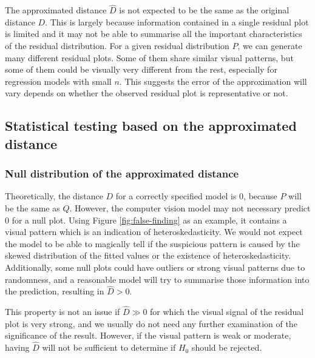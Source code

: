 \documentclass[]{interact}
\theoremstyle{plain}%
\theoremstyle{definition}
\theoremstyle{remark}
\begin{document}
The approximated distance \(\hat{D}\) is not expected to be the same as
the original distance \(D\). This is largely because information
contained in a single residual plot is limited and it may not be able to
summarise all the important characteristics of the residual
distribution. For a given residual distribution \(P\), we can generate
many different residual plots. Some of them share similar visual
patterns, but some of them could be visually very different from the
rest, especially for regression models with small \(n\). This suggests
the error of the approximation will vary depends on whether the observed
residual plot is representative or not.

\hypertarget{statistical-testing-based-on-the-approximated-distance}{%
\subsection{Statistical testing based on the approximated
distance}\label{statistical-testing-based-on-the-approximated-distance}}

\hypertarget{null-distribution-of-the-approximated-distance}{%
\subsubsection{Null distribution of the approximated
distance}\label{null-distribution-of-the-approximated-distance}}

Theoretically, the distance \(D\) for a correctly specified model is
\(0\), because \(P\) will be the same as \(Q\). However, the computer
vision model may not necessary predict \(0\) for a null plot. Using
Figure \ref{fig:false-finding} as an example, it contains a visual
pattern which is an indication of heteroskedasticity. We would not
expect the model to be able to magically tell if the suspicious pattern
is caused by the skewed distribution of the fitted values or the
existence of heteroskedasticity. Additionally, some null plots could
have outliers or strong visual patterns due to randomness, and a
reasonable model will try to summarise those information into the
prediction, resulting in \(\hat{D} > 0\).

This property is not an issue if \(\hat{D} \gg 0\) for which the visual
signal of the residual plot is very strong, and we usually do not need
any further examination of the significance of the result. However, if
the visual pattern is weak or moderate, having \(\hat{D}\) will not be
sufficient to determine if \(H_0\) should be rejected.
\end{document}
